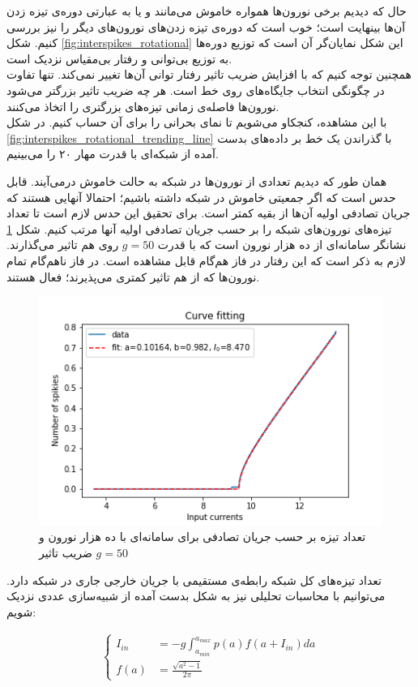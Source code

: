 حال که دیدیم برخی نورون‌ها همواره خاموش می‌مانند و یا به عبارتی دوره‌ی تیزه زدن آن‌ها بینهایت است؛ خوب است که دوره‌ی تیزه زدن‌های نورون‌های دیگر را نیز بررسی کنیم. شکل \ref{fig:interspikes_rotational} این شکل نمایان‌گر آن است که توزیع دوره‌ها به توزیع بی‌توانی و رفتار بی‌مقیاس نزدیک است.\\
همچنین توجه کنیم که با افزایش ضریب تاثیر رفتار توانی آن‌ها تغییر نمی‌کند. تنها تفاوت در چگونگی انتخاب جایگاه‌های روی خط است. هر چه ضریب تاثیر بزرگتر می‌شود نورون‌ها فاصله‌ی زمانی تیزه‌های بزرگتری را اتخاذ می‌کنند.
\\
با این مشاهده، کنجکاو می‌شویم تا نمای بحرانی را برای آن حساب کنیم. در شکل \ref{fig:interspikes_rotational_trending_line} با گذراندن یک خط بر داده‌های بدست آمده از شبکه‌ای با قدرت مهار ۲۰ را می‌بینیم.


همان طور که دیدیم تعدادی از نورون‌ها در شبکه به حالت خاموش درمی‌آیند. قابل حدس است که اگر جمعیتی خاموش در شبکه داشته باشیم؛ احتمالا آنهایی هستند که جریان تصادفی اولیه آن‌ها از بقیه کمتر است. برای تحقیق این حدس لازم است تا تعداد تیزه‌های نورون‌های شبکه را بر حسب جریان تصادفی اولیه آنها مرتب کنیم. شکل \ref{fig:spikes_num_vs_background_current} نشانگر سامانه‌ای از ده هزار نورون است که با قدرت $g=50$ روی هم تاثیر می‌گذارند. لازم به ذکر است که این رفتار در فاز هم‌گام قابل مشاهده است. در فاز ناهم‌گام تمام نورون‌ها که از هم تاثیر کمتری می‌پذیرند؛ فعال هستند.

\begin{figure}[b]
	\centering
	\includegraphics[width = 0.5 \textwidth]{../papers_studies/figs/Rotational/spikies_num_vs_input_fitted_curve_g50_input_3.5_13.5.png}
	\caption{تعداد تیزه بر حسب جریان تصادفی برای سامانه‌ای با ده هزار نورون و ضریب تاثیر $g=50$}
	\label{fig:spikes_num_vs_background_current}
\end{figure}


تعداد تیزه‌های کل شبکه رابطه‌ی مستقیمی با جریان خارجی جاری در شبکه دارد. می‌توانیم با محاسبات تحلیلی نیز به شکل بدست آمده از شبیه‌سازی عددی نزدیک شویم:

\begin{align}
	\begin{cases}
		I_{in} &= -g \int_{a_{min}}^{a_{max}} p(a) f(a + I_{in}) da \\
		f(a) &= \frac{\sqrt{a^2 - 1}}{2\pi}
	\end{cases}
	\label{eq:analytical_input_current}
\end{align}

